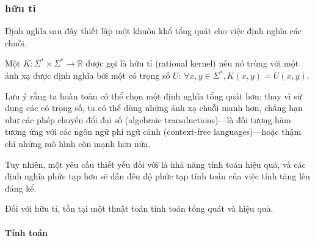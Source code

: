 \subsubsection{\protect{} hữu tỉ}

Định nghĩa sau đây thiết lập một khuôn khổ tổng quát cho việc định nghĩa các
 chuỗi.

\begin{defn}
  Một  $K \colon \Sigma^\ast \times \Sigma^\ast \to \mathbb{R}$ được
  gọi là  hữu tỉ (rational kernel) nếu nó trùng với một ánh xạ được
  định nghĩa bởi một  có trọng số $U$: $\forall x, y \in
  \Sigma^\ast, K(x, y) = U(x, y)$.
\end{defn}

Lưu ý rằng ta hoàn toàn có thể chọn một định nghĩa tổng quát hơn: thay vì sử
dụng các  có trọng số, ta có thể dùng những ánh xạ chuỗi mạnh
hơn, chẳng hạn như các phép chuyển đổi đại số (algebraic transductions)---là
đối tượng hàm tương ứng với các ngôn ngữ phi ngữ cảnh (context-free
languages)---hoặc thậm chí những mô hình còn mạnh hơn nữa.

Tuy nhiên, một yêu cầu thiết yếu đối với  là khả năng tính toán hiệu
quả, và các định nghĩa phức tạp hơn sẽ dẫn đến độ phức tạp tính toán của việc
tính  tăng lên đáng kể.

Đối với  hữu tỉ, tồn tại một thuật toán tính toán tổng quát và hiệu
quả.

\paragraph{Tính toán}

